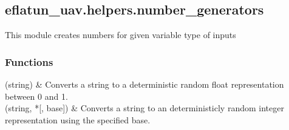\documentclass[letterpaper,10pt,english]{sphinxmanual}
\begin{document}
\sphinxstepscope


\subsection{eflatun\_uav.helpers.number\_generators}
\label{\detokenize{generated/eflatun_uav.helpers.number_generators:module-eflatun_uav.helpers.number_generators}}\label{\detokenize{generated/eflatun_uav.helpers.number_generators:eflatun-uav-helpers-number-generators}}\label{\detokenize{generated/eflatun_uav.helpers.number_generators::doc}}
\sphinxAtStartPar
This module creates numbers for given variable type of inputs
\subsubsection*{Functions}


\begin{savenotes}\sphinxattablestart
\sphinxthistablewithglobalstyle
\sphinxthistablewithnovlinesstyle
\centering
\begin{tabulary}{\linewidth}[t]{}
\sphinxtoprule
\sphinxtableatstartofbodyhook
\sphinxAtStartPar
{\hyperref[\detokenize{generated/eflatun_uav.helpers.number_generators:eflatun_uav.helpers.number_generators.convert_string_to_float}]{}}(string)
&
\sphinxAtStartPar
Converts a string to a deterministic random float representation between 0 and 1.
\\
\sphinxhline
\sphinxAtStartPar
{\hyperref[\detokenize{generated/eflatun_uav.helpers.number_generators:eflatun_uav.helpers.number_generators.convert_string_to_int}]{}}(string, *{[}, base{]})
&
\sphinxAtStartPar
Converts a string to an deterministicly random integer representation using the specified base.
\\
\sphinxbottomrule
\end{tabulary}
\sphinxtableafterendhook\par
\sphinxattableend\end{savenotes}
\end{document}
